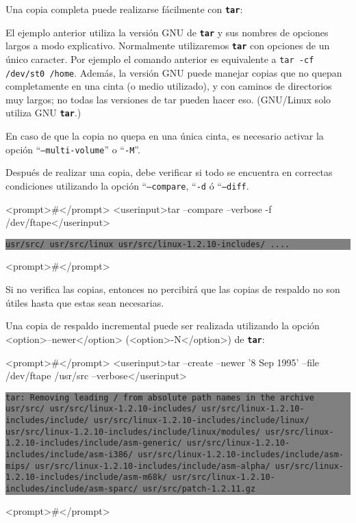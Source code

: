 ﻿\documentclass[12pt]{article}
\begin{document}
Una copia completa puede realizarse fácilmente con \texttt{\textbf{tar}}:


El ejemplo anterior utiliza la versión GNU de \texttt{\textbf{tar}} y sus 
nombres de opciones largos a modo explicativo. Normalmente utilizaremos 
\texttt{\textbf{tar}} con opciones de un único caracter. Por ejemplo el 
comando anterior es equivalente a {\tt tar -cf /dev/st0 /home}. 
Además, la versión GNU puede manejar copias que no quepan completamente 
en una cinta (o medio utilizado), y con caminos de
directorios muy largos; no todas las versiones de tar pueden hacer eso. 
(GNU/Linux solo utiliza GNU \texttt{\textbf{tar}}.)  

En caso de que la copia no quepa en una única cinta, es necesario activar la
 opción ``{\tt --multi-volume}'' o ``{\tt -M}''. 

Después de realizar una copia, debe verificar si todo se encuentra en 
correctas condiciones utilizando la opción ``{\tt --compare}, ``{\tt -d} ó 
``{\tt --diff}. 


<prompt>#</prompt> <userinput>tar --compare --verbose -f 
/dev/ftape</userinput>
\colorbox{grey}{\parbox[t]{0.95\linewidth}{ \vspace*{0.5cm} {\tt usr/src/
usr/src/linux
usr/src/linux-1.2.10-includes/
.... } \vspace*{0.5cm} } } 
<prompt>#</prompt>



Si no verifica las copias, entonces no percibirá que las copias de respaldo no 
son útiles hasta que estas sean necesarias.
	
	

Una copia de respaldo incremental puede ser realizada utilizando la opción 
<option>--newer</option>
	(<option>-N</option>) de \texttt{\textbf{tar}}:


<prompt>#</prompt> <userinput>tar --create --newer '8 Sep 1995' 
--file /dev/ftape /usr/src 
--verbose</userinput>
\colorbox{grey}{\parbox[t]{0.95\linewidth}{ \vspace*{0.5cm} {\tt tar: Removing leading / from absolute path names in 
the archive
usr/src/
usr/src/linux-1.2.10-includes/
usr/src/linux-1.2.10-includes/include/
usr/src/linux-1.2.10-includes/include/linux/
usr/src/linux-1.2.10-includes/include/linux/modules/
usr/src/linux-1.2.10-includes/include/asm-generic/
usr/src/linux-1.2.10-includes/include/asm-i386/
usr/src/linux-1.2.10-includes/include/asm-mips/
usr/src/linux-1.2.10-includes/include/asm-alpha/
usr/src/linux-1.2.10-includes/include/asm-m68k/
usr/src/linux-1.2.10-includes/include/asm-sparc/
usr/src/patch-1.2.11.gz } \vspace*{0.5cm} } } 
<prompt>#</prompt>
\end{document}
